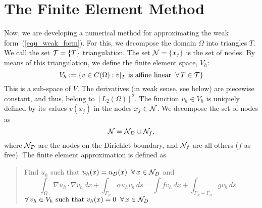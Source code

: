 \section{The Finite Element Method}
%
Now, we are developing a numerical method for approximating the weak
form~(\ref{equ_weak_form}). For this, we decompose the domain $\Omega$
into triangles $T$. We call the set ${\cal T} = \{ T \}$
triangulation. The set ${\cal N} = \{ x_j \}$ is the set of nodes.
By means of this triangulation, we define the finite element space,
$V_h$:
%
$$
V_h := \{ v \in C(\Omega) : v|_T \mbox{ is affine linear } \; \forall \, T \in {\cal T} \}
$$
%
This is a sub-space of $V$. The derivatives (in weak sense, see below) are
piecewise constant, and thus, belong to $[L_2(\Omega)]^2$.
The function $v_h \in V_h$ is uniquely defined by its values $v(x_j)$ in the 
nodes $x_j \in {\cal N}$. We decompose the set of nodes as
$$
{\cal N} = {\cal N}_D \cup {\cal N}_f,
$$
%
where ${\cal N_D}$ are the nodes on the Dirichlet boundary, and
${\cal N}_f$ are all others ($f$ as free).  The finite element approximation 
is defined as
%
\begin{quote}
Find $u_h$ such that $u_h(x) = u_D(x) \; \; \forall \, x \in {\cal N}_D$ and
\begin{equation}
\label{equ_fem}
\int_\Omega \nabla u_h \cdot \nabla v_h \, dx + \int_{\Gamma_R} \alpha u_h v_h \, ds =
\int f v_h \, dx + \int_{\Gamma_N+\Gamma_R} g v_h \, ds \quad
\end{equation}
\hfill
$\forall \, v_h \in V_h \mbox{ such that } v_h(x) = 0 \; \; \forall \, x \in {\cal N}_D$
\end{quote}

